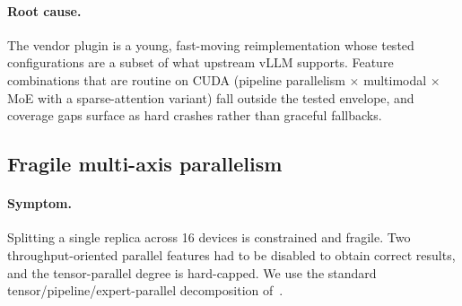 \documentclass{article}
\begin{document}
\paragraph{Root cause.} The vendor plugin is a young, fast-moving
reimplementation whose tested configurations are a subset of what upstream vLLM
supports. Feature combinations that are routine on CUDA (pipeline parallelism
$\times$ multimodal $\times$ MoE with a sparse-attention variant) fall outside the
tested envelope, and coverage gaps surface as hard crashes rather than graceful
fallbacks.

\subsection{Fragile multi-axis parallelism}
\label{sec:parallelism}
\paragraph{Symptom.} Splitting a single replica across 16 devices is constrained
and fragile. Two throughput-oriented parallel features had to be disabled to
obtain correct results, and the tensor-parallel degree is hard-capped. We use the
standard tensor/pipeline/expert-parallel decomposition of~\cite{megatron,gpipe,gshard}.
\end{document}
